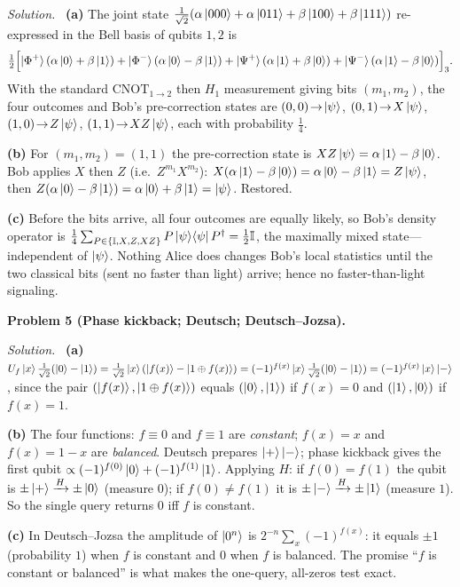 \documentclass[11pt]{article}
\newcommand{\id}{\mathbb{I}}
\newcommand{\dg}{^{\dagger}}
\newcommand{\proj}[1]{\ket{#1}\!\bra{#1}}
\newcommand{\CNOT}{\mathrm{CNOT}}
\newcommand{\sol}{\smallskip\noindent\textit{Solution.}\ }
\newcommand{\problem}[1]{\bigskip\noindent\textbf{Problem #1.}\ }
\begin{document}
\sol
\textbf{(a)} The joint state
$\tfrac1{\sqrt2}(\alpha\ket{000}+\alpha\ket{011}+\beta\ket{100}+\beta\ket{111})$
re-expressed in the Bell basis of qubits $1,2$ is
\[
 \tfrac12\Bigl[\ket{\Phi^+}(\alpha\ket0+\beta\ket1)+\ket{\Phi^-}(\alpha\ket0-\beta\ket1)
 +\ket{\Psi^+}(\alpha\ket1+\beta\ket0)+\ket{\Psi^-}(\alpha\ket1-\beta\ket0)\Bigr]_3 .
\]
With the standard $\CNOT_{1\to2}$ then $H_1$ measurement giving bits $(m_1,m_2)$, the
four outcomes and Bob's pre-correction states are
$(0,0)\!\to\!\ket\psi$, $(0,1)\!\to\! X\ket\psi$, $(1,0)\!\to\! Z\ket\psi$,
$(1,1)\!\to\! XZ\ket\psi$, each with probability $\tfrac14$.

\textbf{(b)} For $(m_1,m_2)=(1,1)$ the pre-correction state is
$XZ\ket\psi=\alpha\ket1-\beta\ket0$. Bob applies $X$ then $Z$ (i.e.\ $Z^{m_1}X^{m_2}$):
$X(\alpha\ket1-\beta\ket0)=\alpha\ket0-\beta\ket1=Z\ket\psi$, then
$Z(\alpha\ket0-\beta\ket1)=\alpha\ket0+\beta\ket1=\ket\psi$. Restored.

\textbf{(c)} Before the bits arrive, all four outcomes are equally likely, so Bob's
density operator is $\tfrac14\sum_{P\in\{\id,X,Z,XZ\}}P\proj{\psi}P\dg=\tfrac12\id$,
the maximally mixed state---independent of $\ket\psi$. Nothing Alice does changes
Bob's local statistics until the two classical bits (sent no faster than light)
arrive; hence no faster-than-light signaling.

\problem{5 (Phase kickback; Deutsch; Deutsch--Jozsa)}

\sol
\textbf{(a)} $U_f\ket{x}\tfrac1{\sqrt2}(\ket0-\ket1)
=\tfrac1{\sqrt2}\ket x(\ket{f(x)}-\ket{1\oplus f(x)})
=(-1)^{f(x)}\ket x\tfrac1{\sqrt2}(\ket0-\ket1)=(-1)^{f(x)}\ket x\ket-$, since the pair
$(\ket{f(x)},\ket{1\oplus f(x)})$ equals $(\ket0,\ket1)$ if $f(x)=0$ and
$(\ket1,\ket0)$ if $f(x)=1$.

\textbf{(b)} The four functions: $f\equiv0$ and $f\equiv1$ are \emph{constant};
$f(x)=x$ and $f(x)=1-x$ are \emph{balanced}. Deutsch prepares $\ket+\ket-$; phase
kickback gives the first qubit $\propto(-1)^{f(0)}\ket0+(-1)^{f(1)}\ket1$. Applying
$H$: if $f(0)=f(1)$ the qubit is $\pm\ket+\xrightarrow{H}\pm\ket0$ (measure $0$); if
$f(0)\neq f(1)$ it is $\pm\ket-\xrightarrow{H}\pm\ket1$ (measure $1$). So the single
query returns $0$ iff $f$ is constant.

\textbf{(c)} In Deutsch--Jozsa the amplitude of $\ket{0^n}$ is
$2^{-n}\sum_x(-1)^{f(x)}$: it equals $\pm1$ (probability $1$) when $f$ is constant and
$0$ when $f$ is balanced. The promise ``$f$ is constant or balanced'' is what makes
the one-query, all-zeros test exact.
\end{document}
